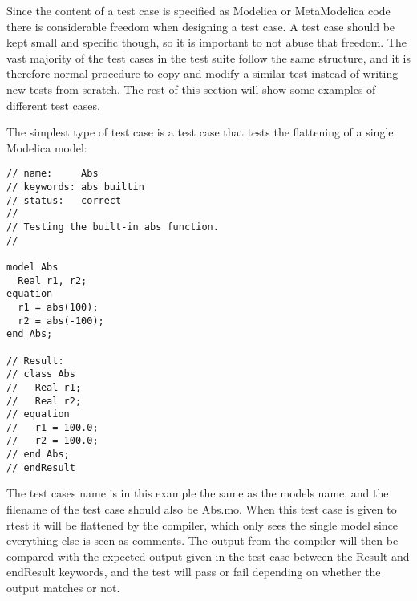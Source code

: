 Since the content of a test case is specified as Modelica or MetaModelica code
there is considerable freedom when designing a test case. A test case should be
kept small and specific though, so it is important to not abuse that freedom.
The vast majority of the test cases in the test suite follow the same structure,
and it is therefore normal procedure to copy and modify a similar test instead
of writing new tests from scratch. The rest of this section will show some
examples of different test cases.

The simplest type of test case is a test case that tests the flattening of a
single Modelica model:
\begin{lstlisting}[language=modelica]
// name:     Abs
// keywords: abs builtin
// status:   correct
//
// Testing the built-in abs function.
//

model Abs
  Real r1, r2;
equation
  r1 = abs(100);
  r2 = abs(-100);
end Abs;

// Result:
// class Abs
//   Real r1;
//   Real r2;
// equation
//   r1 = 100.0;
//   r2 = 100.0;
// end Abs;
// endResult
\end{lstlisting}
The test cases name is in this example the same as the models name, and the
filename of the test case should also be Abs.mo. When this test case is given to
rtest it will be flattened by the compiler, which only sees the single model
since everything else is seen as comments. The output from the compiler will
then be compared with the expected output given in the test case between the
Result and endResult keywords, and the test will pass or fail depending on
whether the output matches or not.

